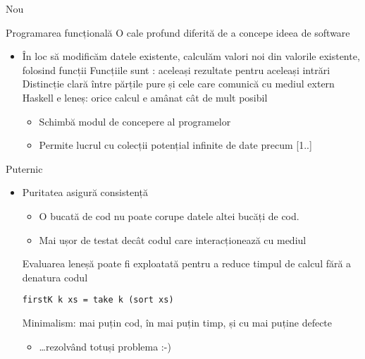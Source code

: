 \documentclass[xcolor=pdftex,romanian,colorlinks]{beamer}
\begin{document}
\begin{frame}{Nou}
\begin{block}{Programarea funcțională}
O cale profund diferită de a concepe ideea de software
\end{block}
\begin{itemize}
\item În loc să modificăm datele existente, calculăm valori noi din valorile existente, folosind funcții
\vitem Funcțiile sunt : aceleași rezultate pentru aceleași intrări
\vitem Distincție clară între părțile pure și cele care comunică cu mediul extern
\vitem Haskell e leneș: orice calcul e amânat cât de mult posibil
\begin{itemize}
\item Schimbă modul de concepere al programelor
\item Permite lucrul cu colecții potențial infinite de date precum [1..]
\end{itemize}
\end{itemize}
\end{frame}

\begin{frame}[fragile]{Puternic}
\begin{itemize}
\item Puritatea asigură consistență

\begin{itemize}
\item O bucată de cod nu poate corupe datele altei bucăți de cod.
\item Mai ușor de testat decât codul care interacționează cu mediul
\end{itemize}

\vitem Evaluarea leneșă poate fi exploatată pentru a reduce timpul de calcul fără a denatura codul
\begin{lstlisting}
firstK k xs = take k (sort xs)
\end{lstlisting}

\vitem Minimalism: mai puțin cod, în mai puțin timp, și cu mai puține defecte
\begin{itemize}
\item
\dots rezolvând totuși problema :-)
\end{itemize}
\end{itemize}
\end{frame}
\end{document}

